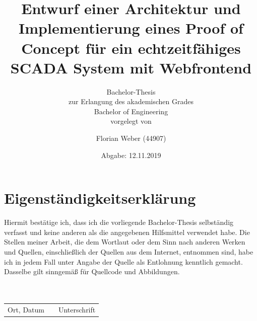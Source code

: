 \documentclass[paper=A4,12pt,oneside,bibliography=totoc,listof=totoc,open=any]{scrreprt}
\title{\Huge Entwurf einer Architektur und Implementierung eines Proof of Concept für ein
echtzeitfähiges SCADA System mit Webfrontend}
\date{\normalfont Abgabe: 12.11.2019}
\author{Florian Weber (44907)}
\subtitle  {\LARGE\vspace{1cm}Bachelor-Thesis \\ \large zur Erlangung des akademischen Grades \\ Bachelor of Engineering \\ \vspace{0.3cm}\normalfont vorgelegt von}
\begin{document}
\maketitle	%

\chapter*{Eigenständigkeitserklärung}
Hiermit bestätige ich, dass ich die vorliegende Bachelor-Thesis selbständig verfasst und 
keine anderen als die angegebenen Hilfsmittel verwendet habe. 
Die Stellen meiner Arbeit, die dem Wortlaut oder dem Sinn nach anderen Werken und Quellen, 
einschließlich der Quellen aus dem Internet, entnommen sind, 
habe ich in jedem Fall unter Angabe der Quelle als Entlohnung kenntlich gemacht. 
Dasselbe gilt sinngemäß für Quellcode und Abbildungen.
\\ \\ \\
\begin{tabularx}{\linewidth}{XXX}\cline{1-1}\cline{3-3}
Ort, Datum  & & Unterschrift
\end{tabularx}
\tableofcontents 	%
\newpage


\newpage

\listoffigures		%
\newpage


\listoflistings
\newpage


\newpage
 




\end{document}
